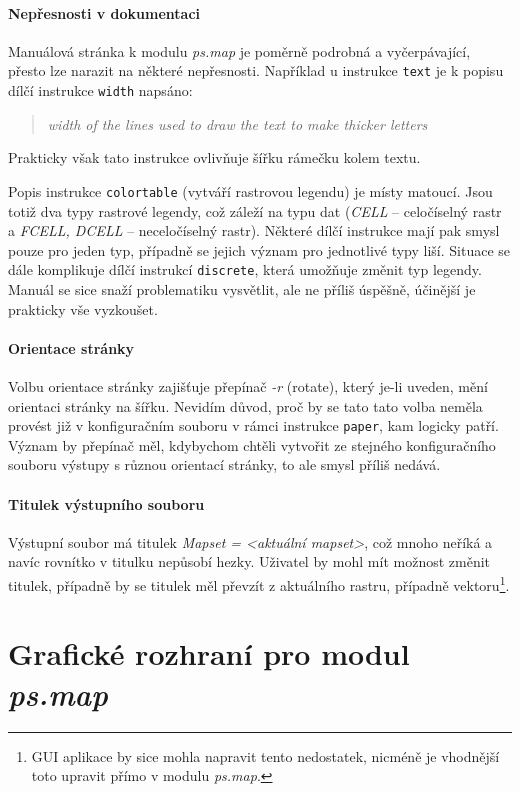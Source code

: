 \documentclass[a4paper,12pt,draft]{article}
\newcommand{\modul}[1]{\emph{#1}}
\newcommand{\instr}[1]{\lstinline[style=psmapInline]|#1|}
\begin{document}
\paragraph*{Nepřesnosti v dokumentaci}
\label{sec:psmap:manual}
Manuálová stránka \cite{manual} k modulu \modul{ps.map} je poměrně podrobná a vyčerpávající, přesto lze narazit na některé nepřesnosti. Například u instrukce \instr{text} je k popisu dílčí instrukce \instr{width} napsáno:
 \begin{quotation}\it
width of the lines used to draw the text to make thicker letters
\end{quotation}
Prakticky však tato instrukce ovlivňuje šířku rámečku kolem textu.

Popis instrukce \instr{colortable} (vytváří rastrovou legendu) je místy matoucí. Jsou totiž dva typy rastrové legendy, což záleží na typu dat (\emph{CELL} -- celočíselný rastr a \emph{FCELL, DCELL} -- neceločíselný rastr). Některé dílčí instrukce mají pak smysl pouze pro jeden typ, případně se jejich význam pro jednotlivé typy liší. Situace se dále komplikuje dílčí instrukcí \instr{discrete}, která umožňuje změnit typ legendy. Manuál se sice snaží problematiku vysvětlit, ale ne příliš úspěšně, účinější je prakticky vše vyzkoušet.

\paragraph*{Orientace stránky}
Volbu orientace stránky zajišťuje přepínač \emph{-r} (rotate), který je-li uveden, mění orientaci stránky na šířku. Nevidím důvod, proč by se tato tato volba neměla provést již v konfiguračním souboru v rámci instrukce \instr{paper}, kam logicky patří. Význam by přepínač měl, kdybychom chtěli vytvořit ze stejného konfiguračního souboru výstupy s různou orientací stránky, to ale smysl příliš nedává.

\paragraph*{Titulek výstupního souboru}
Výstupní soubor má titulek \emph{Mapset = \textless aktuální mapset\textgreater}, což mnoho neříká a navíc rovnítko v titulku nepůsobí hezky. Uživatel by mohl mít možnost změnit titulek, případně by se titulek měl převzít z aktuálního rastru, případně vektoru\footnote{GUI aplikace by sice mohla napravit tento nedostatek, nicméně je vhodnější toto upravit přímo v modulu \modul{ps.map}.}.

\section{Grafické rozhraní pro modul \modul{ps.map}}
\label{sec:gui}
\end{document}
